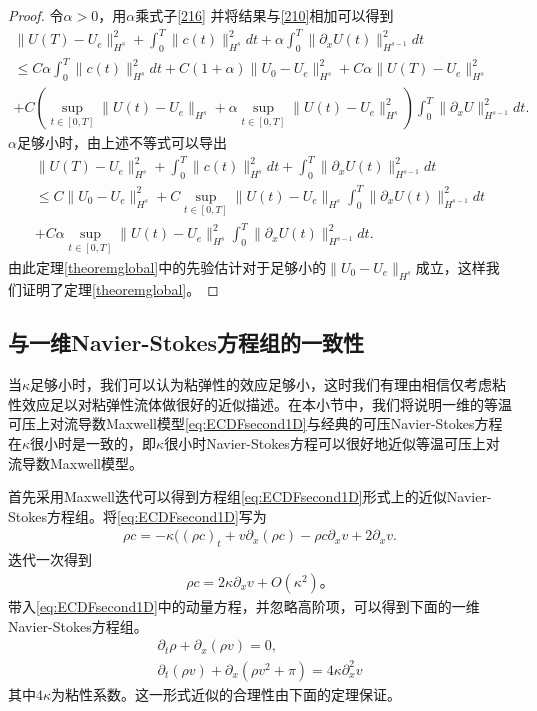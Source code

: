 \begin{proof}
令$\alpha>0$，用$\alpha$乘式子\eqref{216} 并将结果与\eqref{210}相加可以得到
\begin{eqnarray*}
  \|U(T)-U_e\|_{H^s}^2 + \int_0^T \|c(t)\|_{H^s}^2 dt + \alpha \int_0^T \|\partial_x U(t)\|_{H^{s-1}}^2 dt \\
  \le C \alpha \int_0^T \|c(t)\|_{H^s}^2 dt +C(1+\alpha)\|U_0 -U_e\|_{H^s}^2 + C \alpha \|U(T)-U_e\|_{H^s}^2  \\ + C(\sup_{t \in [0,T]} \|U(t)-U_e\|_{H^s} + \alpha \sup_{t \in [0,T]} \|U(t)-U_e\|_{H^s}^2)  \int_0^T \|\partial_x U\|_{H^{s-1}}^2 dt.
\end{eqnarray*}
$\alpha$足够小时，由上述不等式可以导出
\begin{eqnarray*}
  \|U(T)-U_e\|_{H^s}^2 + \int_0^T \|c(t)\|_{H^s}^2 dt + \int_0^T \|\partial_x U(t)\|_{H^{s-1}}^2 dt \\
  \le C \|U_0-U_e\|_{H^s}^2 + C \sup_{t \in [0,T]} \|U(t)-U_e\|_{H^s} \int_0^T \|\partial_x U(t)\|_{H^{s-1}}^2 dt \\
  +C\alpha  \sup_{t \in [0,T]} \|U(t)-U_e\|_{H^s}^2 \int_0^T \|\partial_x U(t)\|_{H^{s-1}}^2 dt.
\end{eqnarray*}
由此定理\ref{theoremglobal}中的先验估计对于足够小的$\|U_0 -U_e\|_{H^s}$成立，这样我们证明了定理\ref{theoremglobal}。
\end{proof}

\subsection{与一维Navier-Stokes方程组的一致性}

当$\kappa$足够小时，我们可以认为粘弹性的效应足够小，这时我们有理由相信仅考虑粘性效应足以对粘弹性流体做很好的近似描述。在本小节中，我们将说明一维的等温可压上对流导数Maxwell模型\eqref{eq:ECDFsecond1D}与经典的可压Navier-Stokes方程在$\kappa$很小时是一致的，即$\kappa$很小时Navier-Stokes方程可以很好地近似等温可压上对流导数Maxwell模型。

首先采用Maxwell迭代可以得到方程组\eqref{eq:ECDFsecond1D}形式上的近似Navier-Stokes方程组。将\eqref{eq:ECDFsecond1D}写为
\begin{eqnarray*}
 \rho c= -\kappa(( \rho c)_t + v \partial_x (\rho c) -  \rho c \partial_x v + 2 \partial_x v.
\end{eqnarray*}
迭代一次得到
\begin{eqnarray*}
  \rho c = 2 \kappa \partial_x v + O(\kappa^2)。
\end{eqnarray*}
带入\eqref{eq:ECDFsecond1D}中的动量方程，并忽略高阶项，可以得到下面的一维Navier-Stokes方程组。
\begin{align}\label{51}
  \partial_t \rho + \partial_x (\rho v ) = 0, \nonumber \\
  \partial_t (\rho v) + \partial_x( \rho v^2 + \pi) = 4 \kappa \partial^2_x v
\end{align}
其中$4\kappa$为粘性系数。这一形式近似的合理性由下面的定理保证。

